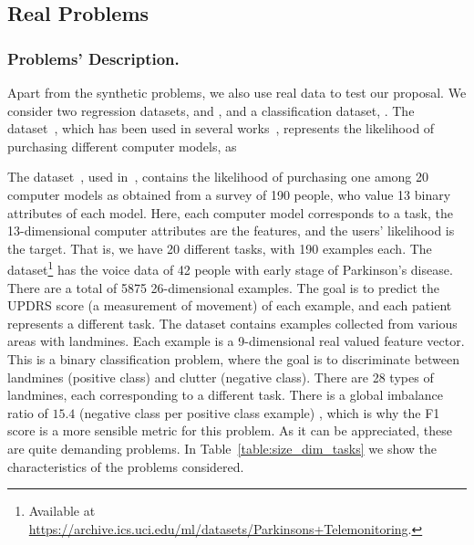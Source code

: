 \subsection{Real Problems}

\subsubsection*{Problems' Description.}

%

%

Apart from the synthetic problems, we also use real data to test our proposal. We consider two regression datasets,  and , and a classification dataset, .
%
The  dataset~\cite{Lenk96}, which has been used in several works~\citep{ArgyriouEP08,AgarwalDG10,KumarD12,JeongJ18}, represents the likelihood of purchasing different computer models, as 



%
The  dataset~\cite{Lenk96}, used in~\cite{ArgyriouEP08,AgarwalDG10,KumarD12,JeongJ18}, contains the likelihood of purchasing one among 20 computer models as obtained from a survey of 190 people, who value 13 binary attributes of each model.
Here, each computer model corresponds to a task, the 13-dimensional computer attributes are the features, and the users' likelihood is the target.
That is, we have 20 different tasks, with 190 examples each.
%
The  dataset\footnote{Available at \url{https://archive.ics.uci.edu/ml/datasets/Parkinsons+Telemonitoring}.} has the voice data of 42 people with early stage of Parkinson's disease.
There are a total of \num{5875} 26-dimensional examples.
The goal is to predict the UPDRS score (a measurement of movement) of each example, and each patient represents a different task.
%
The  dataset contains examples collected from various areas with landmines.
Each example is a 9-dimensional real valued feature vector.
This is a binary classification problem, where the goal is to discriminate between landmines (positive class) and clutter (negative class).
There are 28 types of landmines, each corresponding to a different task.
There is a global imbalance ratio of $15.4$ (negative class per positive class example) , which is why the F1 score is a more sensible metric for this problem.
%
As it can be appreciated, these are quite demanding problems.
In Table~\ref{table:size_dim_tasks} we show the characteristics of the problems considered.

